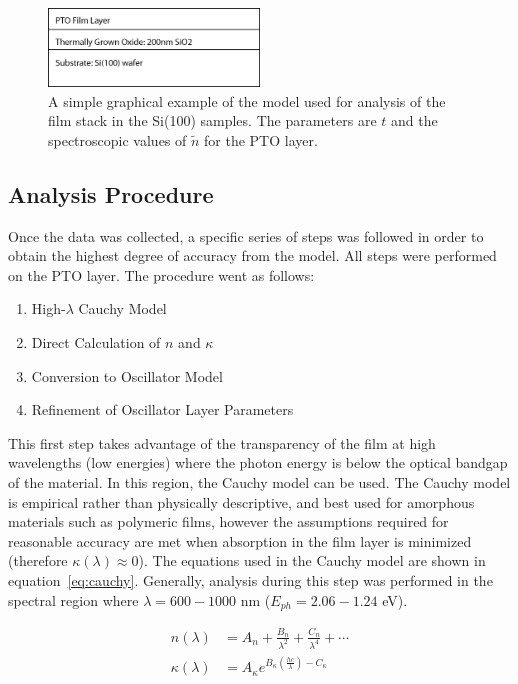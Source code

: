 \begin{figure}[tb]
   \centering
   \includegraphics[width=0.5\textwidth]{./figures/DataAnalysis/ellipsometry-model}
   \caption[Graphical Schematic of VASE Model]{A simple graphical example of the model used for %
   					analysis of the film stack in the Si(100) samples. The parameters %
					are $t$ and the spectroscopic values of $\tilde{n}$ for the PTO layer.}
   \label{fig:Si(100)-model}
\end{figure}


\subsection{Analysis Procedure}

Once the data was collected, a specific series of steps was followed in order to obtain the highest degree of accuracy from the model. All steps were performed on the PTO layer. The procedure went as follows:

\begin{enumerate}
\item
High-$\lambda$ Cauchy Model
\item
Direct Calculation of $n$ and $\kappa$
\item
Conversion to Oscillator Model
\item
Refinement of Oscillator Layer Parameters
\end{enumerate}

This first step takes advantage of the transparency of the film at high wavelengths (low energies) where the photon energy is below the optical bandgap of the material. In this region, the Cauchy model can be used. The Cauchy model is empirical rather than physically descriptive, and best used for amorphous materials such as polymeric films, however the assumptions required for reasonable accuracy are met when absorption in the film layer is minimized (therefore $\kappa(\lambda)\approx0$). The equations used in the Cauchy model are shown in equation~\vref{eq:cauchy}. Generally, analysis during this step was performed in the spectral region where $\lambda = 600-1000$ nm ($E_{ph} = 2.06-1.24$ eV). 

\begin{subequations}
\label{eq:cauchy}
\begin{align}
	n\left(\lambda\right) &= A_{n} + \frac{B_{n}}{\lambda^{2}}+\frac{C_{n}}{\lambda^{4}}+\cdots\\
        	\kappa\left(\lambda\right) &= A_{\kappa}e^{B_{\kappa}\left(\frac{hc}{\lambda}\right)-C_{\kappa}}
\end{align}
\end{subequations}

